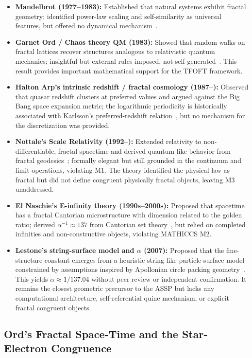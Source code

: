 \documentclass[11pt,a4paper]{article}
\begin{document}
\begin{itemize}
  \item \textbf{Mandelbrot (1977--1983):} Established that natural systems exhibit fractal geometry; identified power-law scaling and self-similarity as universal features, but offered no dynamical mechanism~\cite{Mandelbrot1983}.
  \item \textbf{Garnet Ord / Chaos theory QM (1983):} Showed that random walks on fractal lattices recover structures analogous to relativistic quantum mechanics; insightful but external rules imposed, not self-generated~\cite{Ord1983}. This result provides important mathematical support for the TFOFT framework.
  \item \textbf{Halton Arp's intrinsic redshift / fractal cosmology (1987--):} Observed that quasar redshift clusters at preferred values and argued against the Big Bang space expansion metric; the logarithmic periodicity is historically associated with Karlsson's preferred-redshift relation~\cite{Karlsson1971,Mal2020}, but no mechanism for the discretization was provided.
  \item \textbf{Nottale's Scale Relativity (1992--):} Extended relativity to non-differentiable, fractal spacetime and derived quantum-like behavior from fractal geodesics~\cite{Nottale2011}; formally elegant but still grounded in the continuum and limit operations, violating M1. The theory identified the physical law as fractal but did not define congruent physically fractal objects, leaving M3 unaddressed.
  \item \textbf{El Naschie's E-infinity theory (1990s--2000s):} Proposed that spacetime has a fractal Cantorian microstructure with dimension related to the golden ratio; derived $\alpha^{-1}\approx137$ from Cantorian set theory~\cite{ElNaschie1997}, but relied on completed infinities and non-constructive objects, violating MATHICCS M2.
  \item \textbf{Lestone's string-surface model and $\alpha$ (2007):} Proposed that the fine-structure constant emerges from a heuristic string-like particle-surface model constrained by assumptions inspired by Apollonian circle packing geometry~\cite{Lestone2007}. This yields $\alpha \approx 1/137.04$ without peer review or independent confirmation. It remains the closest geometric precursor to the ASSP but lacks any computational architecture, self-referential quine mechanism, or explicit fractal congruent objects.
\end{itemize}

\subsection{Ord's Fractal Space-Time and the Star-Electron Congruence}
\end{document}
